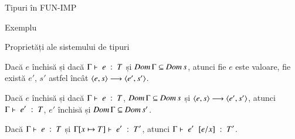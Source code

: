 \documentclass[xcolor=pdftex,romanian,colorlinks]{beamer}
\begin{document}
\begin{section}{Tipuri în FUN-IMP}
\begin{frame}{Exemplu}{}
\end{frame}

\begin{frame}{Proprietăți ale sistemului de tipuri}
\begin{theorem}[Progres]
Dacă $e$ închisă și dacă $\tjud{e}{T}$ și $\Dom \Gamma \subseteq \Dom s$, atunci fie $e$ este valoare, fie există $e'$, $s'$ astfel încât 
$\c{e,s}\longrightarrow\c{e',s'}$.

\end{theorem}

\begin{theorem}
Dacă $e$ închisă și dacă $\tjud{e}{T}$, $\Dom \Gamma \subseteq \Dom s$ și 
$\c{e,s}\longrightarrow\c{e',s'}$, atunci $\tjud{e'}{T}$, $e'$ închisă și $\Dom \Gamma \subseteq \Dom s'$.

\end{theorem}

\begin{lemma}

Dacă $\tjud{e}{T}$ și $\tjud[{\Gamma[x\mapsto T]}]{e'}{T'}$, atunci
$\tjud{\substapp{e'}{\subst{\substpair{e}{x}}}}{T'}$.

\end{lemma}

\end{frame}

\end{section}
\end{document}
